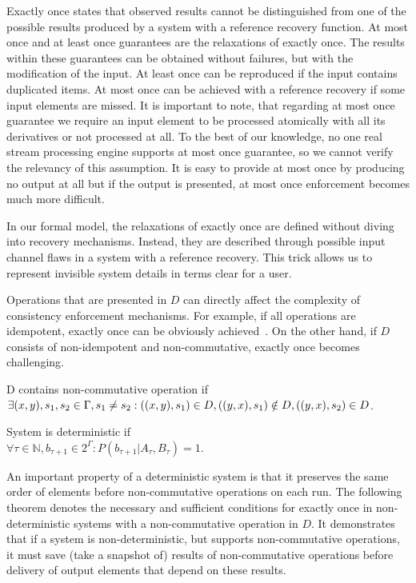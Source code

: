 Exactly once states that observed results cannot be distinguished from one of the possible results produced by a system with a reference recovery function. At most once and at least once guarantees are the relaxations of exactly once. The results within these guarantees can be obtained without failures, but with the modification of the input. At least once can be reproduced if the input contains duplicated items. At most once can be achieved with a reference recovery if some input elements are missed. It is important to note, that regarding at most once guarantee we require an input element to be processed atomically with all its derivatives or not processed at all. To the best of our knowledge, no one real stream processing engine supports at most once guarantee, so we cannot verify the relevancy of this assumption. It is easy to provide at most once by producing no output at all but if the output is presented, at most once enforcement becomes much more difficult.  

In our formal model, the relaxations of exactly once are defined without diving into recovery mechanisms. Instead, they are described through possible input channel flaws in a system with a reference recovery. This trick allows us to represent invisible system details in terms clear for a user.

Operations that are presented in $D$ can directly affect the complexity of consistency enforcement mechanisms. For example, if all operations are idempotent, exactly once can be obviously achieved~\cite{Akidau:2013:MFS:2536222.2536229}. On the other hand, if $D$ consists of non-idempotent and non-commutative, exactly once becomes challenging.

\begin{definition}{D contains non-commutative operation}
if\\ 
$\exists (x,y), s_1, s_2 \in \Gamma, s_1 \neq s_2: \\ ((x,y),s_1)\in D, \\ ((y,x),s_1)\notin D, \\ ((y,x),s_2)\in D$.
\end{definition}

\begin{definition}{System is deterministic}
if\\ 
$\forall{\tau\in{\mathbb{N}}, b_{\tau+1}\in{2^{\Gamma}}}:P(b_{\tau+1}|A_{\tau},B_\tau)=1$.
\end{definition}

An important property of a deterministic system is that it preserves the same order of elements before non-commutative operations on each run. The following theorem denotes the necessary and sufficient conditions for exactly once in non-deterministic systems with a non-commutative operation in $D$. It demonstrates that if a system is non-deterministic, but supports non-commutative operations, it must save (take a snapshot of) results of non-commutative operations before delivery of output elements that depend on these results.

